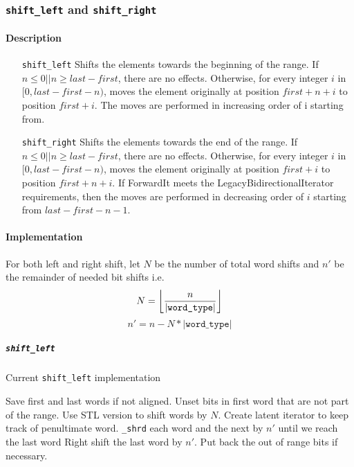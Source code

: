 \documentclass[letterpaper, 8pt]{article}
\DeclarePairedDelimiter\floor{\lfloor}{\rfloor}
\begin{document}
\subsubsection{\texttt{shift\_left} and \texttt{shift\_right}}
\label{subsubsec:shift}
\paragraph{Description}
\begin{itemize}
    \item[\texttt{shift\_left}] Shifts the elements towards the beginning of the 
            range. If $n \leq 0 || n \geq last - first$, there are no effects. 
            Otherwise, for every integer $i$ in $[0, last - first - n)$, moves 
            the element originally at position $first + n + i$ to position 
            $first + i$. The moves are performed in increasing order of i 
            starting from.
    \item[\texttt{shift\_right}] Shifts the elements towards the end of the 
        range. If $n \leq 0 || n \geq last - first$, there are no effects. 
        Otherwise, for every integer $i$ in $[0, last - first - n)$, moves the 
        element originally at position $first + i$ to position $first + n + i$. 
        If ForwardIt meets the LegacyBidirectionalIterator requirements, then 
        the moves are performed in decreasing order of $i$ starting from 
        $last - first - n - 1$.
\end{itemize}

\paragraph{Implementation}
For both left and right shift, let $N$ be the number of total word shifts and 
$n'$ be the remainder of needed bit shifts i.e.
$$N=\floor*{\frac{n}{|\texttt{word\_type}|}}$$ $$n'=n-N*|\texttt{word\_type}|$$
\subparagraph{\texttt{shift\_left}}

\begin{algorithm}[H]
    \caption{Current \texttt{shift\_left} implementation}
    \begin{algorithmic}[1]
            \State Save first and last words if not aligned.
            \State Unset bits in first word that are not part of 
            the range.
            \State Use STL version to shift words by $N$.
            \State Create latent iterator to keep track of penultimate word.
            \State \texttt{\_shrd} each word and the next by $n'$ until we 
            reach the last word
            \State Right shift the last word by $n'$.
            \State Put back the out of range bits if necessary.
        \EndFunction
    \end{algorithmic}
\end{algorithm}
\end{document}
